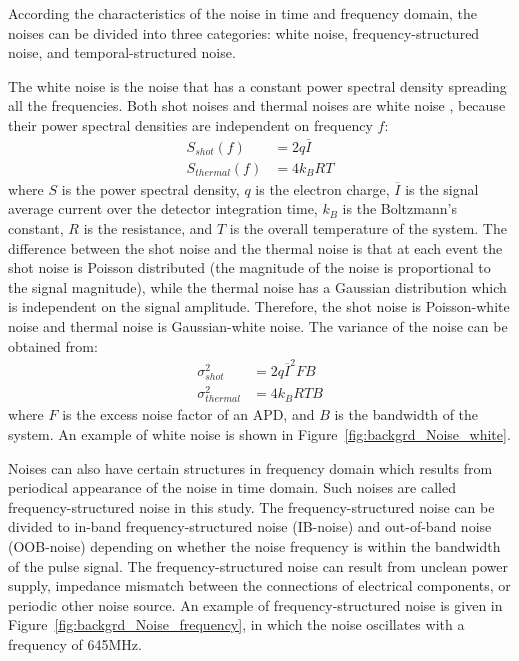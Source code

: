 According the characteristics of the noise in time and frequency domain, the noises can be divided into three categories: white noise,  frequency-structured noise, and temporal-structured noise.\par
The white noise is the noise that has a constant power spectral density spreading all the frequencies. Both shot noises and thermal noises are white noise \cite{Kittel2004ElementaryPhysics}\cite{Blanter2000ShotConductors}, because their power spectral densities are independent on frequency $f$:
\begin{align}
S_{shot}(f) &= 2q\overline{I} \\
S_{thermal}(f) &= 4k_BRT
\end{align}
where $S$ is the power spectral density, $q$ is the electron charge, $\overline{I}$ is the signal average current over the detector integration time,  $k_B$ is the Boltzmann's constant, $R$ is the resistance, and $T$  is the overall temperature of the system. The difference between the shot noise and the thermal noise is that at each event the shot noise is Poisson distributed (\ie the magnitude of the noise is proportional to the signal magnitude), while the thermal noise has a Gaussian distribution which is independent on the signal amplitude. Therefore, the shot noise is Poisson-white noise and thermal noise is Gaussian-white noise. The variance of the noise can be obtained from: 
\begin{align}
\sigma_{shot}^2 &= 2q\overline{I}^2FB\\
\sigma_{thermal}^2 &= 4k_BRTB
\end{align}
where $F$ is the excess noise factor of an APD, and $B$ is the bandwidth of the system. An example of white noise is shown in Figure~\ref{fig:backgrd_Noise_white}.\par
Noises can also have certain structures in frequency domain which results from periodical appearance of the noise in time domain. Such noises are called frequency-structured noise in this study. The frequency-structured noise can be divided to in-band frequency-structured noise (IB-noise) and out-of-band noise (OOB-noise) depending on whether the noise frequency is within the bandwidth of the pulse signal. The frequency-structured noise can result from unclean power supply, impedance mismatch between the connections of electrical components, or periodic other noise source. An example of frequency-structured noise is given in Figure~\ref{fig:backgrd_Noise_frequency}, in which the noise oscillates with a frequency of 645MHz. \par
